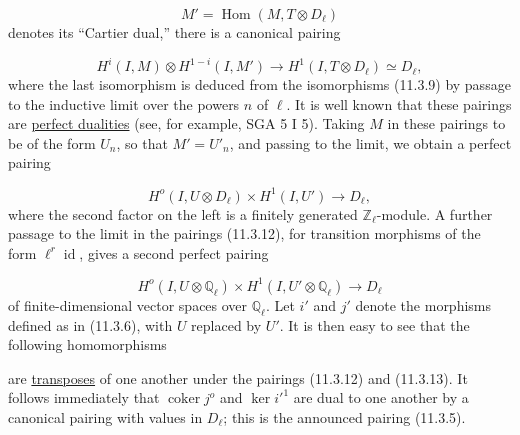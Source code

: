 \begin{equation}\tag{11.3.10}
M'=\operatorname{Hom}(M,T\otimes D_\ell)
\end{equation}
denotes its ``Cartier dual,'' there is a canonical pairing

\begin{equation}\tag{11.3.11}
H^i(I,M)\otimes H^{1-i}(I,M')
 \longrightarrow H^1(I,T\otimes D_\ell)\simeq D_\ell,
\end{equation}
where the last isomorphism is deduced from the isomorphisms (11.3.9) by
passage to the inductive limit over the powers $n$ of $\ell$. It is well
known that these pairings are \underline{perfect dualities} (see, for
example, SGA 5 I 5). Taking $M$ in these pairings to be of the form
$U_n$, so that $M'=U'_n$, and passing to the limit, we obtain a perfect
pairing

\begin{equation}\tag{11.3.12}
H^o(I,U\otimes D_\ell)\times H^1(I,U')\longrightarrow D_\ell,
\end{equation}
where the second factor on the left is a finitely generated
$\mathbb Z_\ell$-module. A further passage to the limit in the pairings
(11.3.12), for transition morphisms of the form
$\ell^r\operatorname{id}$, gives a second perfect pairing

\begin{equation}\tag{11.3.13}
H^o(I,U\otimes\mathbb Q_\ell)
 \times H^1(I,U'\otimes\mathbb Q_\ell)
 \longrightarrow D_\ell
\end{equation}
of finite-dimensional vector spaces over $\mathbb Q_\ell$. Let $i'$ and
$j'$ denote the morphisms defined as in (11.3.6), with $U$ replaced by
$U'$. It is then easy to see that the following homomorphisms

\begin{center}
\end{center}
are \underline{transposes} of one another under the pairings (11.3.12)
and (11.3.13). It follows immediately that
$\operatorname{coker}j^o$ and $\ker {i'}^1$ are dual to one another by a
canonical pairing with values in $D_\ell$; this is the announced pairing
(11.3.5).
